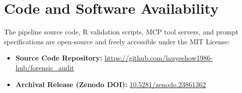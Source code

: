 \documentclass[11pt,a4paper]{article}
\begin{document}
\section{Code and Software Availability}
The pipeline source code, R validation scripts, MCP tool servers, and prompt specifications are open-source and freely accessible under the MIT License:
\begin{itemize}
    \item \textbf{Source Code Repository:} \url{https://github.com/lauyeehow1986-hub/forensic_audit}
    \item \textbf{Archival Release (Zenodo DOI):} \href{https://doi.org/10.5281/zenodo.23861362}{10.5281/zenodo.23861362}
\end{itemize}



\end{document}

